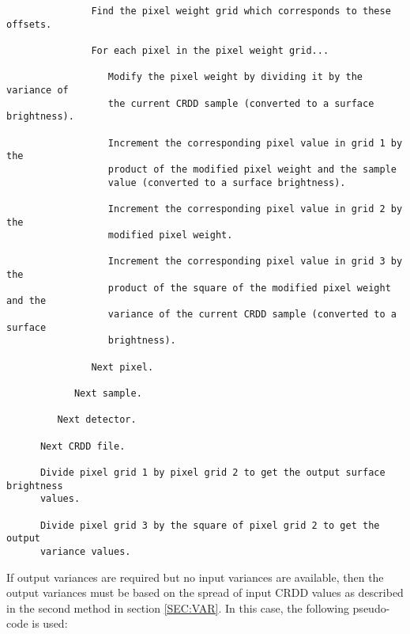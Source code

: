 \begin{verbatim}
               Find the pixel weight grid which corresponds to these offsets.

               For each pixel in the pixel weight grid...

                  Modify the pixel weight by dividing it by the variance of
                  the current CRDD sample (converted to a surface brightness).

                  Increment the corresponding pixel value in grid 1 by the
                  product of the modified pixel weight and the sample
                  value (converted to a surface brightness).

                  Increment the corresponding pixel value in grid 2 by the
                  modified pixel weight.

                  Increment the corresponding pixel value in grid 3 by the
                  product of the square of the modified pixel weight and the
                  variance of the current CRDD sample (converted to a surface
                  brightness).

               Next pixel.

            Next sample.

         Next detector.

      Next CRDD file.

      Divide pixel grid 1 by pixel grid 2 to get the output surface brightness
      values.

      Divide pixel grid 3 by the square of pixel grid 2 to get the output
      variance values.

\end{verbatim}

If output variances are required but no input variances are available, then the
output variances must be based on the spread of input CRDD values as
described in the second method in section \ref {SEC:VAR}. In this case, the
following pseudo-code is used:

